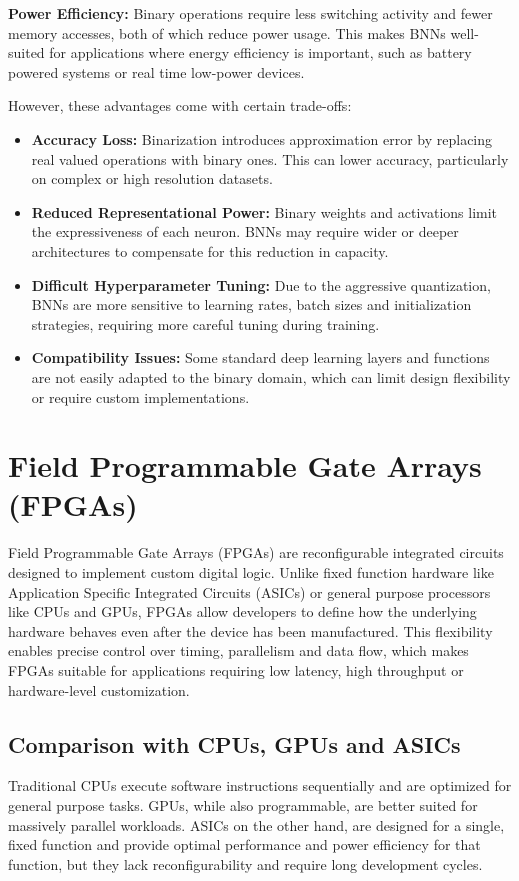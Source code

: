 \documentclass[a4paper,12pt]{report}
\begin{document}
\noindent\textbf{Power Efficiency:} Binary operations require less switching activity and fewer memory accesses, both of which reduce power usage. This makes BNNs well-suited for applications where energy efficiency is important, such as battery powered systems or real time low-power devices.

\noindent However, these advantages come with certain trade-offs:
\begin{itemize}
    \item \textbf{Accuracy Loss:} Binarization introduces approximation error by replacing real valued operations with binary ones. This can lower accuracy, particularly on complex or high resolution datasets.
    \item \textbf{Reduced Representational Power:} Binary weights and activations limit the expressiveness of each neuron. BNNs may require wider or deeper architectures to compensate for this reduction in capacity.
    \item \textbf{Difficult Hyperparameter Tuning:} Due to the aggressive quantization, BNNs are more sensitive to learning rates, batch sizes and initialization strategies, requiring more careful tuning during training.
    \item \textbf{Compatibility Issues:} Some standard deep learning layers and functions are not easily adapted to the binary domain, which can limit design flexibility or require custom implementations.
\end{itemize}



\clearpage
\section{Field Programmable Gate Arrays (FPGAs)}
Field Programmable Gate Arrays (FPGAs) are reconfigurable integrated circuits designed to implement custom digital logic. Unlike fixed function hardware like Application Specific Integrated Circuits (ASICs) or general purpose processors like CPUs and GPUs, FPGAs allow developers to define how the underlying hardware behaves even after the device has been manufactured. This flexibility enables precise control over timing, parallelism and data flow, which makes FPGAs suitable for applications requiring low latency, high throughput or hardware-level customization.

\subsection{Comparison with CPUs, GPUs and ASICs}
Traditional CPUs execute software instructions sequentially and are optimized for general purpose tasks. GPUs, while also programmable, are better suited for massively parallel workloads. ASICs on the other hand, are designed for a single, fixed function and provide optimal performance and power efficiency for that function, but they lack reconfigurability and require long development cycles.
\end{document}
